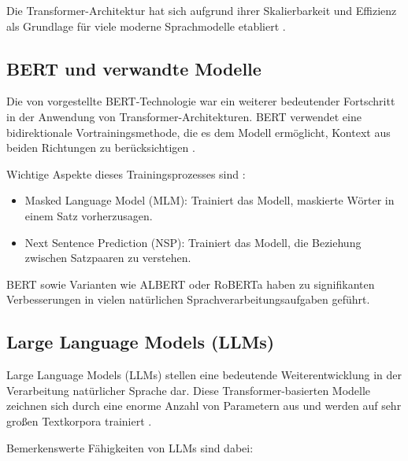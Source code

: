 Die Transformer-Architektur hat sich aufgrund ihrer Skalierbarkeit und Effizienz als Grundlage für viele moderne Sprachmodelle etabliert \cite{VaswaniAshish2023AIAY}.

\subsection{BERT und verwandte Modelle}
\label{subsec:bert}

Die von \textcite{DevlinJacob2019BPoD} vorgestellte \gls{BERT}-Technologie war ein weiterer bedeutender Fortschritt in der Anwendung von Transformer-Architekturen. BERT verwendet eine bidirektionale Vortrainingsmethode, die es dem Modell ermöglicht, Kontext aus beiden Richtungen zu berücksichtigen \cite{DevlinJacob2019BPoD}.

Wichtige Aspekte dieses Trainingsprozesses sind \cite{DevlinJacob2019BPoD}:
\begin{itemize}
	\item Masked Language Model (MLM): Trainiert das Modell, maskierte Wörter in einem Satz vorherzusagen.
	\item Next Sentence Prediction (NSP): Trainiert das Modell, die Beziehung zwischen Satzpaaren zu verstehen.
\end{itemize}
 \gls{BERT}\cite{DevlinJacob2019BPoD} sowie Varianten wie ALBERT\cite{LanZhenzhong2019AALB} oder RoBERTa\cite{liu2019robertarobustlyoptimizedbert} haben zu signifikanten Verbesserungen in vielen natürlichen Sprachverarbeitungsaufgaben geführt.

\subsection{Large Language Models (LLMs)}
\label{subsec:llms}
Large Language Models (LLMs) stellen eine bedeutende Weiterentwicklung in der Verarbeitung natürlicher Sprache dar. Diese Transformer-basierten Modelle zeichnen sich durch eine enorme Anzahl von Parametern aus und werden auf sehr großen Textkorpora trainiert \cite{VaswaniAshish2023AIAY}.

Bemerkenswerte Fähigkeiten von \glspl{LLM} sind dabei:

